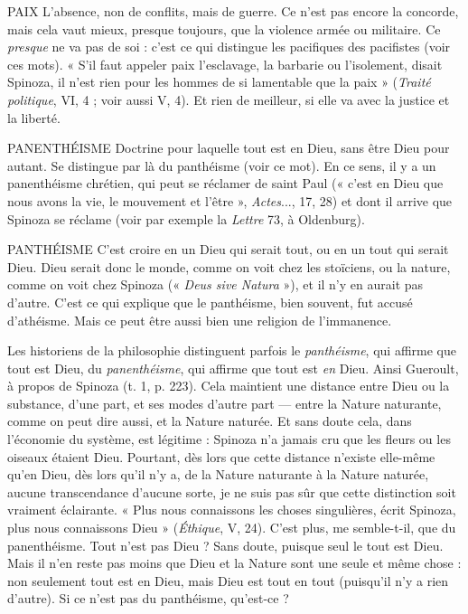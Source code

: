 PAIX  L’absence, non de conflits, mais de guerre. Ce n’est pas encore la
concorde, mais cela vaut mieux, presque toujours, que la violence
armée ou militaire. Ce {\it presque} ne va pas de soi : c’est ce qui distingue les pacifiques
des pacifistes (voir ces mots). « S’il faut appeler paix l’esclavage, la barbarie
ou l'isolement, disait Spinoza, il n’est rien pour les hommes de si lamentable
que la paix » ({\it Traité politique}, VI, 4 ; voir aussi V, 4). Et rien de meilleur,
si elle va avec la justice et la liberté.

PANENTHÉISME Doctrine pour laquelle tout est en Dieu, sans être Dieu
pour autant. Se distingue par là du panthéisme (voir ce
mot). En ce sens, il y a un panenthéisme chrétien, qui peut se réclamer de saint
Paul (« c’est en Dieu que nous avons la vie, le mouvement et l’être », {\it Actes}...,
17, 28) et dont il arrive que Spinoza se réclame (voir par exemple la {\it Lettre} 73,
à Oldenburg).

PANTHÉISME C’est croire en un Dieu qui serait tout, ou en un tout qui
serait Dieu. Dieu serait donc le monde, comme on voit
chez les stoïciens, ou la nature, comme on voit chez Spinoza (« {\it Deus sive
Natura} »), et il n’y en aurait pas d’autre. C’est ce qui explique que le panthéisme,
bien souvent, fut accusé d’athéisme. Mais ce peut être aussi bien une
religion de l’immanence.

Les historiens de la philosophie distinguent parfois le {\it panthéisme}, qui
affirme que tout est Dieu, du {\it panenthéisme}, qui affirme que tout est {\it en} Dieu.
Ainsi Gueroult, à propos de Spinoza (t. 1, p. 223). Cela maintient une distance
entre Dieu ou la substance, d’une part, et ses modes d’autre part — entre la
Nature naturante, comme on peut dire aussi, et la Nature naturée. Et sans
doute cela, dans l’économie du système, est légitime : Spinoza n’a jamais cru
que les fleurs ou les oiseaux étaient Dieu. Pourtant, dès lors que cette distance
n’existe elle-même qu’en Dieu, dès lors qu’il n’y a, de la Nature naturante à la
Nature naturée, aucune transcendance d’aucune sorte, je ne suis pas sûr que
cette distinction soit vraiment éclairante. « Plus nous connaissons les choses
singulières, écrit Spinoza, plus nous connaissons Dieu » ({\it Éthique}, V, 24). C’est
plus, me semble-t-il, que du panenthéisme. Tout n’est pas Dieu ? Sans doute,
puisque seul le tout est Dieu. Mais il n’en reste pas moins que Dieu et la
Nature sont une seule et même chose : non seulement tout est en Dieu, mais
Dieu est tout en tout (puisqu'il n’y a rien d’autre). Si ce n’est pas du panthéisme,
qu'est-ce ?

